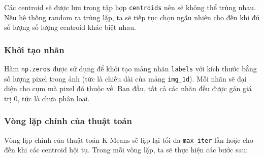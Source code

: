 Các centroid sẽ được lưu trong tập hợp \texttt{centroids} nên sẽ không thể trùng nhau. Nếu hệ thống random ra trùng lặp, ta sẽ tiếp tục chọn ngẫu nhiên cho đến khi đủ số lượng số lượng centroid khác biệt nhau.

\subsubsection{Khởi tạo nhãn}
Hàm \texttt{np.zeros} được sử dụng để khởi tạo mảng nhãn \texttt{labels} với kích thước bằng số lượng pixel trong ảnh (tức là chiều dài của mảng \texttt{img\_1d}). Mỗi nhãn sẽ đại diện cho cụm mà pixel đó thuộc về. Ban đầu, tất cả các nhãn đều được gán giá trị 0, tức là chưa phân loại.

\subsubsection{Vòng lặp chính của thuật toán}
Vòng lặp chính của thuật toán K-Means sẽ lặp lại tối đa \texttt{max\_iter} lần hoặc cho đến khi các centroid hội tụ. Trong mỗi vòng lặp, ta sẽ thực hiện các bước sau:

